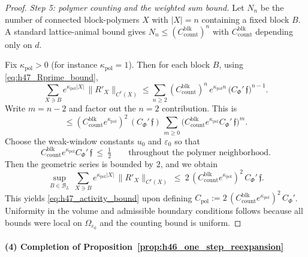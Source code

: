 \begin{proof}
\emph{Step 5: polymer counting and the weighted sum bound.}
Let $N_n$ be the number of connected block-polymers $X$ with $|X|=n$ containing a fixed block $B$.
A standard lattice-animal bound gives $N_n\le (C_{\mathrm{count}}^{\mathrm{blk}})^n$ with $C_{\mathrm{count}}^{\mathrm{blk}}$
depending only on $d$.

Fix $\kappa_{\mathrm{pol}}>0$ (for instance $\kappa_{\mathrm{pol}}=1$).
Then for each block $B$, using \eqref{eq:h47_Rprime_bound},
\[
\sum_{X\ni B} e^{\kappa_{\mathrm{pol}}|X|}\,\|R'_X\|_{C^r(X)}
\le \sum_{n\ge 2} (C_{\mathrm{count}}^{\mathrm{blk}})^n\,e^{\kappa_{\mathrm{pol}}n}\,\bigl(C_{\Phi}'\,\mathfrak f\bigr)^{n-1}.
\]
Write $m=n-2$ and factor out the $n=2$ contribution. This is
\[
\le (C_{\mathrm{count}}^{\mathrm{blk}}e^{\kappa_{\mathrm{pol}}})^2\,(C_{\Phi}'\,\mathfrak f)\,
\sum_{m\ge 0}\bigl(C_{\mathrm{count}}^{\mathrm{blk}}e^{\kappa_{\mathrm{pol}}}C_{\Phi}'\,\mathfrak f\bigr)^m.
\]
Choose the weak-window constants $u_0$ and $\varepsilon_0$ so that
\begin{equation}\label{eq:h47_series_small}
C_{\mathrm{count}}^{\mathrm{blk}}e^{\kappa_{\mathrm{pol}}}C_{\Phi}'\,\mathfrak f\ \le\ \tfrac12
\qquad\text{throughout the polymer neighborhood.}
\end{equation}
Then the geometric series is bounded by $2$, and we obtain
\[
\sup_{B\in\mathcal B_L}\ \sum_{X\ni B} e^{\kappa_{\mathrm{pol}}|X|}\,\|R'_X\|_{C^r(X)}
\ \le\ 2\,(C_{\mathrm{count}}^{\mathrm{blk}}e^{\kappa_{\mathrm{pol}}})^2\,C_{\Phi}'\,\mathfrak f.
\]
This yields \eqref{eq:h47_activity_bound} upon defining $C_{\mathrm{pol}}:=2\,(C_{\mathrm{count}}^{\mathrm{blk}}e^{\kappa_{\mathrm{pol}}})^2\,C_{\Phi}'$.
Uniformity in the volume and admissible boundary conditions follows because all bounds were local on $\Omega_{\varepsilon_0}$ and the
counting bound is uniform.
\end{proof}


\paragraph*{(4) Completion of Proposition~\ref{prop:h46_one_step_reexpansion}}

